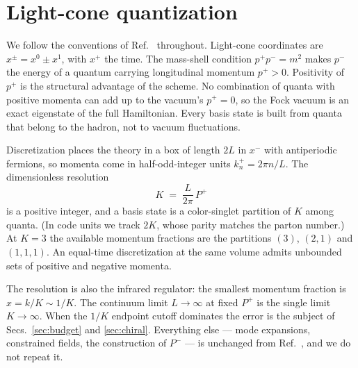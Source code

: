 \section{Light-cone quantization}
\label{sec:lcq}

We follow the conventions of Ref.~\cite{Hornbostel:1988fb} throughout.
Light-cone coordinates are $x^\pm = x^0 \pm x^1$, with $x^+$ the time.  The
mass-shell condition $p^+p^- = m^2$ makes $p^-$ the energy of a quantum
carrying longitudinal momentum $p^+ > 0$.  Positivity of $p^+$ is the
structural advantage of the scheme.  No combination of quanta with positive
momenta can add up to the vacuum's $p^+ = 0$, so the Fock vacuum is an
exact eigenstate of the full Hamiltonian.  Every basis state is built from
quanta that belong to the hadron, not to vacuum fluctuations.

Discretization places the theory in a box of length $2L$ in $x^-$ with
antiperiodic fermions, so momenta come in half-odd-integer units
$k^+_n = 2\pi n/L$.  The dimensionless resolution
\begin{equation}
  K \;=\; \frac{L}{2\pi}\,P^+
  \label{eq:Kdef}
\end{equation}
is a positive integer, and a basis state is a color-singlet partition of
$K$ among quanta.  (In code units we track $2K$, whose parity matches the
parton number.)  At $K = 3$ the available momentum fractions are the
partitions $(3)$, $(2,1)$ and $(1,1,1)$.  An equal-time discretization at
the same volume admits unbounded sets of positive and negative momenta.

The resolution is also the infrared regulator: the smallest momentum
fraction is $x = k/K \sim 1/K$.  The continuum limit $L \to \infty$ at
fixed $P^+$ is the single limit $K \to \infty$.  When the $1/K$ endpoint
cutoff dominates the error is the subject of Secs.~\ref{sec:budget} and
\ref{sec:chiral}.  Everything else --- mode expansions, constrained fields,
the construction of $P^-$ --- is unchanged from
Ref.~\cite{Hornbostel:1988fb}, and we do not repeat it.

